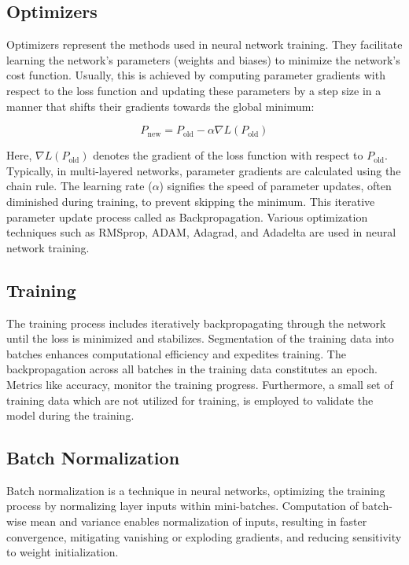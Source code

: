 \documentclass[12pt,twoside,a4paper,parskip]{scrbook} %
\begin{document}
\subsection{Optimizers}
Optimizers represent the methods used in neural network training. They facilitate learning the network's parameters (weights and biases) to minimize the network's cost function. Usually, this is achieved by computing parameter gradients with respect to the loss function and updating these parameters by a step size in a manner that shifts their gradients towards the global minimum:

\[P_{\text{new}} = P_{\text{old}} - \alpha \nabla L(P_{\text{old}})\]

Here, \(\nabla L(P_{\text{old}})\) denotes the gradient of the loss function with respect to \(P_{\text{old}}\). Typically, in multi-layered networks, parameter gradients are calculated using the chain rule. The learning rate (\(\alpha\)) signifies the speed of parameter updates, often diminished during training, to prevent skipping the minimum. This iterative parameter update process called as Backpropagation. Various optimization techniques such as RMSprop, ADAM, Adagrad, and Adadelta are used in neural network training.

\subsection{Training}
The training process includes iteratively backpropagating through the network until the loss is minimized and stabilizes. Segmentation of the training data into batches enhances computational efficiency and expedites training. The backpropagation across all batches in the training data constitutes an epoch. Metrics like accuracy, monitor the training progress. Furthermore, a small set of training data which are not utilized for training, is employed to validate the model during the training.

\subsection{Batch Normalization}
Batch normalization is a technique in neural networks, optimizing the training process by normalizing layer inputs within mini-batches. Computation of batch-wise mean and variance enables normalization of inputs, resulting in faster convergence, mitigating vanishing or exploding gradients, and reducing sensitivity to weight initialization.
\end{document}
